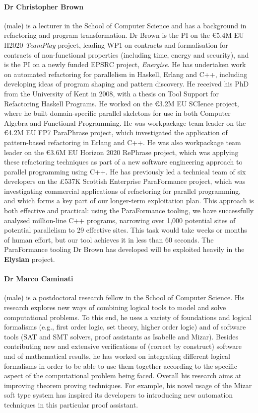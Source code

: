 \documentclass[a4paper,11pt]{article}
\newcommand{\project}[1]{\textbf{#1}\xspace}
\newcommand{\SECURITY}{\project{Elysian}}
\newcommand{\TheProject}{\SECURITY}
\begin{document}
\paragraph{Dr Christopher Brown} (male) is a lecturer in the School of Computer Science and has a background in refactoring and program transformation. Dr Brown is the PI on the \euro{}5.4M EU H2020 \emph{TeamPlay} project, leading WP1 on contracts and formalisation for contracts of non-functional properties (including time, energy and security),
and is the PI on a newly funded EPSRC project, \emph{Energise}. He has undertaken work on automated refactoring for parallelism in Haskell, Erlang and C++, including developing ideas of program shaping and pattern discovery. He received his PhD from the University of Kent in 2008, with a thesis on Tool Support for Refactoring Haskell Programs. He worked on the \euro{}3.2M EU SCIence project, where he built domain-specific parallel skeletons for use in both Computer Algebra and Functional Programming. He was workpackage team leader on the \euro{}4.2M EU FP7 ParaPhrase project, which investigated the application of pattern-based refactoring in Erlang and C++. He was also workpackage team leader on the \euro{}3.6M EU Horizon 2020 RePhrase project, which was applying these refactoring techniques as part of a new software engineering approach to parallel programming using C++. He has previously led a technical team of six developers on the £537K Scottish Enterprise ParaFormance project, which was investigating commercial applications of refactoring for parallel programming, and which forms a key part of our longer-term exploitation plan. This approach is both effective and practical: using the ParaFormance tooling, we have successfully analysed million-line C++ programs, narrowing over 1,000 potential sites of potential parallelism to 29 effective sites. This task would take weeks or months of human effort, but our tool achieves it in less than 60 seconds. The ParaFormance tooling Dr Brown has developed will be exploited heavily in the \TheProject{} project. 

\paragraph{Dr Marco Caminati} (male) is a postdoctoral research fellow in the School of Computer Science. 
His research explores new ways of combining logical tools to model and solve computational problems.
To this end, he uses a variety of foundations and logical formalisms (e.g., first order logic, set theory, higher order logic) and of software tools (SAT and SMT solvers, proof assistants as Isabelle and Mizar).
Besides contributing new and extensive verifications of (correct by construct) software and of mathematical results, he has worked on integrating different logical formalisms in order to be able to use them together according to the specific aspect of the computational problem being faced.
Overall his research aims at improving theorem proving techniques. For example, his novel usage of the Mizar soft type system has inspired its developers to introducing new automation techniques in this particular proof assistant.
\end{document}
